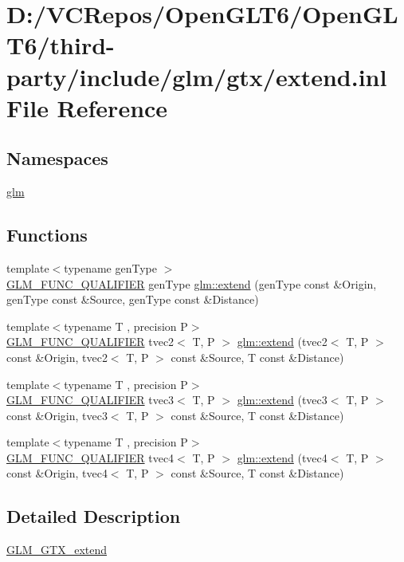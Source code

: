 \hypertarget{extend_8inl}{}\section{D\+:/\+V\+C\+Repos/\+Open\+G\+L\+T6/\+Open\+G\+L\+T6/third-\/party/include/glm/gtx/extend.inl File Reference}
\label{extend_8inl}
\subsection*{Namespaces}
\begin{DoxyCompactItemize}
\item 
 \mbox{\hyperlink{namespaceglm}{glm}}
\end{DoxyCompactItemize}
\subsection*{Functions}
\begin{DoxyCompactItemize}
\item 
{\footnotesize template$<$typename gen\+Type $>$ }\\\mbox{\hyperlink{setup_8hpp_a33fdea6f91c5f834105f7415e2a64407}{G\+L\+M\+\_\+\+F\+U\+N\+C\+\_\+\+Q\+U\+A\+L\+I\+F\+I\+ER}} gen\+Type \mbox{\hyperlink{namespaceglm_a88c4890406fab3280de470ce780e6b9d}{glm\+::extend}} (gen\+Type const \&Origin, gen\+Type const \&Source, gen\+Type const \&Distance)
\item 
{\footnotesize template$<$typename T , precision P$>$ }\\\mbox{\hyperlink{setup_8hpp_a33fdea6f91c5f834105f7415e2a64407}{G\+L\+M\+\_\+\+F\+U\+N\+C\+\_\+\+Q\+U\+A\+L\+I\+F\+I\+ER}} tvec2$<$ T, P $>$ \mbox{\hyperlink{namespaceglm_a432a531afe9ca9e820a0fb31d5d0f5eb}{glm\+::extend}} (tvec2$<$ T, P $>$ const \&Origin, tvec2$<$ T, P $>$ const \&Source, T const \&Distance)
\item 
{\footnotesize template$<$typename T , precision P$>$ }\\\mbox{\hyperlink{setup_8hpp_a33fdea6f91c5f834105f7415e2a64407}{G\+L\+M\+\_\+\+F\+U\+N\+C\+\_\+\+Q\+U\+A\+L\+I\+F\+I\+ER}} tvec3$<$ T, P $>$ \mbox{\hyperlink{namespaceglm_a5771da74ce8281d316accbbd4d704e95}{glm\+::extend}} (tvec3$<$ T, P $>$ const \&Origin, tvec3$<$ T, P $>$ const \&Source, T const \&Distance)
\item 
{\footnotesize template$<$typename T , precision P$>$ }\\\mbox{\hyperlink{setup_8hpp_a33fdea6f91c5f834105f7415e2a64407}{G\+L\+M\+\_\+\+F\+U\+N\+C\+\_\+\+Q\+U\+A\+L\+I\+F\+I\+ER}} tvec4$<$ T, P $>$ \mbox{\hyperlink{namespaceglm_a867ffccf950071fefa345b66fb1578f0}{glm\+::extend}} (tvec4$<$ T, P $>$ const \&Origin, tvec4$<$ T, P $>$ const \&Source, T const \&Distance)
\end{DoxyCompactItemize}


\subsection{Detailed Description}
\mbox{\hyperlink{group__gtx__extend}{G\+L\+M\+\_\+\+G\+T\+X\+\_\+extend}} 